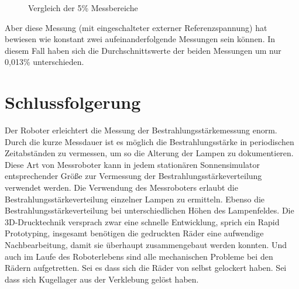 \documentclass[a4paper,bibtotoc,oneside]{scrbook}
\begin{document}
\begin{figure}
\caption{Vergleich der 5\% Messbereiche}
\label{funf}
\end{figure} 



 

Aber diese Messung (mit eingeschalteter externer Referenzspannung) hat bewiesen wie konstant zwei aufeinanderfolgende Messungen sein können. In diesem Fall haben sich die Durchschnittswerte der beiden Messungen um nur 0,013\% unterschieden. 




 





\section{Schlussfolgerung}\thispagestyle{empty}

Der Roboter erleichtert die Messung der Bestrahlungsstärkemessung enorm. Durch die kurze Messdauer ist es möglich die Bestrahlungsstärke in periodischen Zeitabständen zu vermessen, um so die Alterung der Lampen zu dokumentieren. 
Diese Art von Messroboter kann in jedem stationären Sonnensimulator entsprechender Größe zur Vermessung der Bestrahlungsstärkeverteilung verwendet werden. 
Die Verwendung des Messroboters erlaubt die Bestrahlungsstärkeverteilung einzelner Lampen zu ermitteln.
Ebenso die Bestrahlungsstärkeverteilung bei unterschiedlichen Höhen des Lampenfeldes.
Die 3D-Drucktechnik versprach zwar eine schnelle Entwicklung, sprich ein Rapid Prototyping, insgesamt benötigen die gedruckten Räder eine aufwendige Nachbearbeitung, damit sie überhaupt zusammengebaut werden konnten. Und auch im Laufe des Roboterlebens sind alle mechanischen Probleme bei den Rädern aufgetretten. Sei es dass sich die Räder von selbst gelockert haben. Sei dass sich Kugellager aus der Verklebung gelöst haben. 
\end{document}

